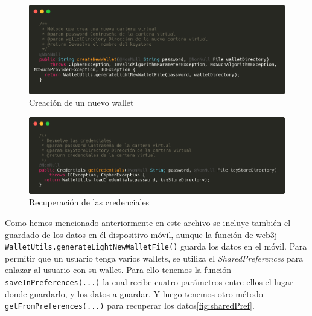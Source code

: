 % 

\begin{figure}[h!]
  \centering
  \includegraphics[width=0.8\linewidth]{figs/Desarrollo/SDK/crearWallet}
  \caption[Creación de un nuevo wallet]{Creación de un nuevo wallet}
  \label{fig:crearWallet}
\end{figure}

\begin{figure}[h!]
  \centering
  \includegraphics[width=0.8\linewidth]{figs/Desarrollo/SDK/recuperarCredenciales}
  \caption[Recuperación de las credenciales]{Recuperación de las credenciales}
  \label{fig:recuperarCredenciales}
\end{figure}

Como hemos mencionado anteriormente en este archivo se incluye también el guardado de los datos en él dispositivo móvil, aunque la función de web3j \verb|WalletUtils.generateLightNewWalletFile()| guarda los datos en el móvil. Para permitir que un usuario tenga varios wallets, se utiliza el \emph{SharedPreferences} para enlazar al usuario con su wallet. Para ello tenemos la función \verb|saveInPreferences(...)| la cual recibe cuatro parámetros entre ellos el lugar donde guardarlo, y los datos a guardar. Y luego tenemos otro método \verb|getFromPreferences(...)| para recuperar los datos\ref{fig:sharedPref}. \\

